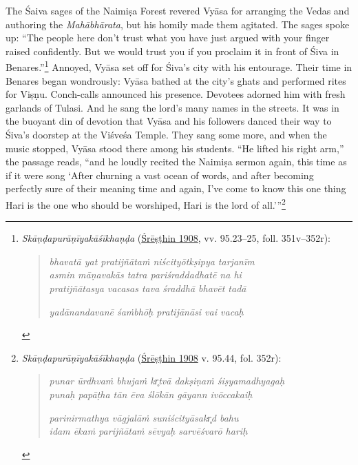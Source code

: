 The Śaiva sages of the Naimiṣa Forest revered Vyāsa for arranging the Vedas and authoring the \emph{Mahābhārata}, but his homily made them agitated. The sages spoke up: “The people here don’t trust what you have just argued with your finger raised confidently. But we would trust you if you proclaim it in front of Śiva in Benares.”\footnote{%
\emph{{Skāṇḍapurāṇīyakāśīkhaṇḍa}} (\hyperref[Kasikhanda1908]{Śrēṣṭhin 1908}, vv. 95.23–25, foll. 351v–352r):

\vspace{-1.5ex}\begin{quote}\raggedright
      \emph{bhavatā yat pratijñātaṁ niścityōtkṣipya tarjanīm}\\
\emph{asmin māṇavakās tatra pariśraddadhatē na hi}\\
\emph{pratijñātasya vacasas tava śraddhā bhavēt tadā}

\emph{yadānandavanē śaṁbhōḥ pratijānāsi vai vacaḥ}\end{quote}\vspace{-1.5ex}
      }
 Annoyed, Vyāsa set off for Śiva’s city with his entourage. Their time in Benares began wondrously: Vyāsa bathed at the city’s ghats and performed rites for Viṣṇu. Conch-calls announced his presence. Devotees adorned him with fresh garlands of Tulasi. And he sang the lord’s many names in the streets. It was in the buoyant din of devotion that Vyāsa and his followers danced their way to Śiva’s doorstep at the Viśveśa Temple. They sang some more, and when the music stopped, Vyāsa stood there among his students. “He lifted his right arm,” the passage reads, “and he loudly recited the Naimiṣa sermon again, this time as if it were song  \Dash  ‘After churning a vast ocean of words, and after becoming perfectly sure of their meaning time and again, I’ve come to know this one thing  \Dash  Hari is the one who should be worshiped, Hari is the lord of all.’”\footnote{%
\emph{{Skāṇḍapurāṇīyakāśīkhaṇḍa}} (\hyperref[Kasikhanda1908]{Śrēṣṭhin 1908} v. 95.44, fol. 352r):

\vspace{-1.5ex}\begin{quote}\raggedright
      \emph{punar ūrdhvaṁ bhujaṁ kr̥tvā dakṣiṇaṁ śiṣyamadhyagaḥ}\\
\emph{punaḥ papāṭha tān ēva ślōkān gāyann ivōccakaiḥ}

\emph{parinirmathya vāgjalāṁ suniścityāsakr̥d bahu}\\
\emph{idam ēkaṁ parijñātaṁ sēvyaḥ sarvēśvarō hariḥ}\end{quote}\vspace{-1.5ex}
      }


